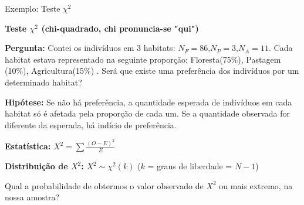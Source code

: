 \documentclass{beamer}\usepackage[]{graphicx}\usepackage[]{color}
\begin{document}
\begin{frame}{Exemplo: Teste $\chi^2$}


\textbf{Teste  $\chi^2$ (chi-quadrado, chi pronuncia-se "qui")}

\begin{footnotesize}

\textbf{Pergunta:} Contei os indivíduos em 3 habitats: $N_F=86$,$N_P=3$,$N_A=11$. Cada habitat estava representado na seguinte proporção: Floresta(75\%), Pastagem (10\%), Agricultura(15\%) . Será que existe uma preferência dos indivíduos por um determinado habitat?


\textbf{Hipótese:} Se não há preferência, a quantidade esperada de indivíduos em cada habitat só é afetada  pela proporção de cada um. Se a quantidade observada for diferente da esperada, há indício de preferência.


\textbf{Estatística:} $X^2 = \sum{\frac{(O-E)^2}{E}}$

\textbf{Distribuição de $X^2$:} $X^2 \sim \chi^2(k)$ ($k$ =  graus de liberdade = $N -1$)


Qual a probabilidade de obtermos o valor observado de $X^2$ ou mais extremo, na nossa amostra?


\end{footnotesize}

\end{frame} 
\end{document}
